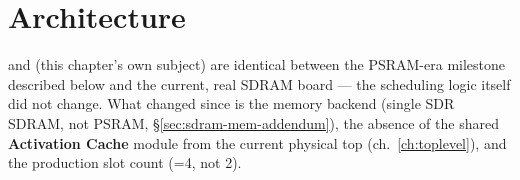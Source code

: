 \chapter{Architecture}
\label{ch:arch}

\begin{fnnote}
 and  (this
chapter's own subject) are identical between the PSRAM-era milestone
described below and the current, real SDRAM board --- the scheduling
logic itself did not change. What changed since is the memory backend
(single SDR SDRAM, not PSRAM, \S\ref{sec:sdram-mem-addendum}), the
absence of the shared \textbf{Activation Cache} module from the current
physical top (ch.~\ref{ch:toplevel}), and the production slot count
(=4, not 2).
\end{fnnote}

